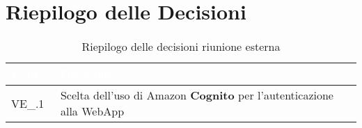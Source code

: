 \section{Riepilogo delle Decisioni}


\begin{table}[!htbp]
\renewcommand{\arraystretch}{1.5}
\begin{tabular}{m{}<{\centering}  m{}<{\centering}}
\rowcolor{darkblue} \textcolor{white}{\textbf{Codice}} & \textcolor{white}{\textbf{Decisione}} \\
\hline
VE\_\D{}.1 & Scelta dell'uso di Amazon \textbf{Cognito} per l'autenticazione alla WebApp\\

\end{tabular}
\caption{Riepilogo delle decisioni riunione esterna \D{}}
\end{table}
